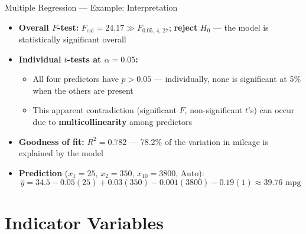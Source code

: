 \documentclass[12pt, aspectratio=169]{beamer}
\begin{document}
    \begin{frame}{Multiple Regression --- Example: Interpretation}
        \begin{itemize}
            \item \textbf{Overall $F$-test:} $F_{\text{cal}} = 24.17 \gg F_{0.05,\,4,\,27}$; \textbf{reject} $H_0$ --- the model is statistically significant overall
            \item \textbf{Individual $t$-tests at $\alpha = 0.05$:}
            \begin{itemize}
                \item All four predictors have $p > 0.05$ --- individually,  none is significant at 5\% when the others are present
                \item This apparent contradiction (significant $F$, non-significant $t$'s) can occur due to \textbf{multicollinearity} among predictors
            \end{itemize}
            \item \textbf{Goodness of fit:} $R^2 = 0.782$ --- 78.2\% of the variation in mileage is explained by the model
            \item \textbf{Prediction} ($x_1=25$, $x_2=350$, $x_{10}=3800$, Auto):
                \[
                    \hat{y} = 34.5 - 0.05(25) + 0.03(350) - 0.001(3800) - 0.19(1)
                    \approx 39.76 \text{ mpg}
                \]
        \end{itemize}
    \end{frame}


    \section{Indicator Variables}
\end{document}
